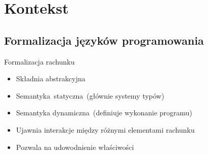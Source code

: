 \documentclass{beamer}
\begin{document}
\section{Kontekst}

\subsection{Formalizacja języków programowania}


\begin{frame}{Formalizacja rachunku}
  \begin{itemize}
    \item Składnia abstrakcyjna
    \item Semantyka statyczna (głównie systemy typów)
    \item Semantyka dynamiczna (definiuje wykonanie programu)
    \item Ujawnia interakcje między różnymi elementami rachunku
    \item Pozwala na udowodnienie właściwości
  \end{itemize}
\end{frame}
\end{document}
